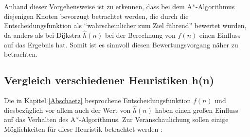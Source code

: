 		Anhand dieser Vorgehensweise ist zu erkennen, dass bei dem A*-Algorithmus diejenigen Knoten bevorzugt betrachtet werden, die durch die Entscheidungsfunktion als "`wahrscheinlicher zum Ziel führend"' bewertet wurden, da anders als bei Dijkstra $\hat{h}(n)$ bei der Berechnung von $f(n)$ einen Einfluss auf das Ergebnis hat. Somit ist es sinnvoll diesen Bewertungsvorgang näher zu betrachten. 
		
	\subsection{Vergleich verschiedener Heuristiken h(n)}
		\label{Heuristik}
		Die in Kapitel \ref{Abschaetz} besprochene Entscheidungsfunktion $f(n)$ und diesbezüglich vor allem auch der Wert von $\hat{h}(n)$ haben einen großen Einfluss auf das Verhalten des A*-Algorithmus.
		Zur Veranschaulichung sollen einige Möglichkeiten für diese Heuristik betrachtet werden \cite{Patel2016}:

